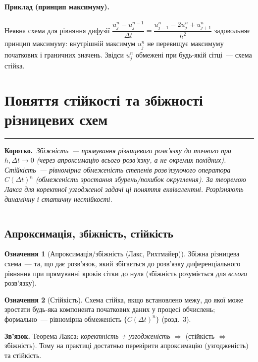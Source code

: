 \documentclass[12pt,a4paper]{article}
\theoremstyle{definition}
\newtheorem{ozn}{Означення}[section]
\theoremstyle{plain}
\newenvironment{korotko}
  {\par\medskip\noindent\begingroup\color{accent!75!black}\rule{\linewidth}{0.4pt}\par
   \noindent\textbf{Коротко.}\itshape\,}
  {\par\noindent\rule{\linewidth}{0.4pt}\endgroup\medskip}
\begin{document}
\paragraph{Приклад (принцип максимуму).} Неявна схема для рівняння
дифузії
$\dfrac{u_j^n-u_j^{n-1}}{\Delta t}=\dfrac{u_{j-1}^n-2u_j^n+u_{j+1}^n}{h^2}$
задовольняє принцип максимуму: внутрішній максимум $u_j^n$ не перевищує
максимуму початкових і граничних значень. Звідси $u_j^n$ обмежені при
будь-якій сітці~--- схема стійка.

\newpage
\section{Поняття стійкості та збіжності різницевих схем}

\begin{korotko}
\emph{Збіжність}~--- прямування різницевого розв'язку до точного при
$h,\Delta t\to0$ (через апроксимацію всього розв'язку, а не окремих
похідних). \emph{Стійкість}~--- рівномірна обмеженість степенів
розв'язуючого оператора $C(\Delta t)^n$ (обмеженість зростання
збурень/похибок округлення). За теоремою Лакса для коректної узгодженої
задачі ці поняття еквівалентні. Розрізняють \emph{динамічну} і
\emph{статичну} нестійкості.
\end{korotko}

\subsection{Апроксимація, збіжність, стійкість}
\begin{ozn}[Апроксимація/збіжність (Лакс, Рихтмайер)]
Збіжна різницева схема~--- та, що дає розв'язок, який збігається до
розв'язку диференціального рівняння при прямуванні кроків сітки до нуля
(збіжність розуміється для \emph{всього} розв'язку).
\end{ozn}
\begin{ozn}[Стійкість]
Схема стійка, якщо встановлено межу, до якої може зростати будь-яка
компонента початкових даних у процесі обчислень; формально~--- рівномірна
обмеженість $\{C(\Delta t)^n\}$ (розд.~3).
\end{ozn}
\textbf{Зв'язок.} Теорема Лакса: \emph{коректність + узгодженість}
$\Rightarrow$ (стійкість $\Leftrightarrow$ збіжність). Тому на практиці
достатньо перевірити апроксимацію (узгодженість) та стійкість.
\end{document}
